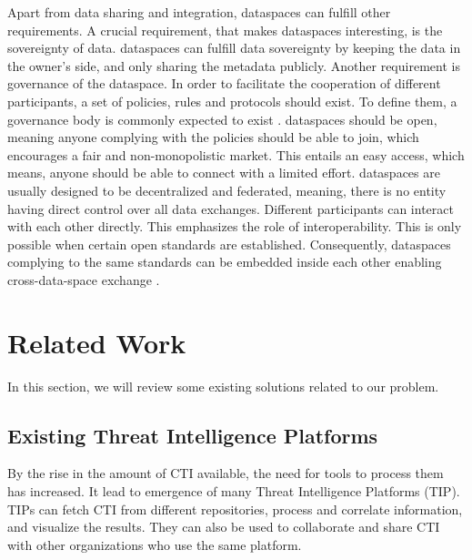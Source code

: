 \documentclass{article}
\begin{document}
Apart from data sharing and integration, dataspaces can fulfill other requirements.
A crucial requirement, that makes dataspaces interesting, is the sovereignty of data. dataspaces can fulfill data sovereignty by keeping the data in the owner's side, and only sharing the metadata publicly.
Another requirement is governance of the dataspace. In order to facilitate the cooperation of different participants, a set of policies, rules and protocols should exist. To define them, a governance body is commonly expected to exist \cite{reiberg_what_2022}.
dataspaces should be open, meaning anyone complying with the policies should be able to join, which encourages a fair and non-monopolistic market. This entails an easy access, which means, anyone should be able to connect with a limited effort.
dataspaces are usually designed to be decentralized and federated, meaning, there is no entity having direct control over all data exchanges. Different participants can interact with each other directly. This emphasizes the role of interoperability. This is only possible when certain open standards are established. Consequently, dataspaces complying to the same standards can be embedded inside each other enabling cross-data-space exchange \cite{reiberg_what_2022}.

\noindent{}

\section{Related Work}
\label{sec:related-work}

In this section, we will review some existing solutions related to our problem. 

\subsection{Existing Threat Intelligence Platforms}

By the rise in the amount of CTI available, the need for tools to process them has increased. It lead to emergence of many Threat Intelligence Platforms (TIP). TIPs can fetch CTI from different repositories, process and correlate information, and visualize the results. They can also be used to collaborate and share CTI with other organizations who use the same platform.
\end{document}

